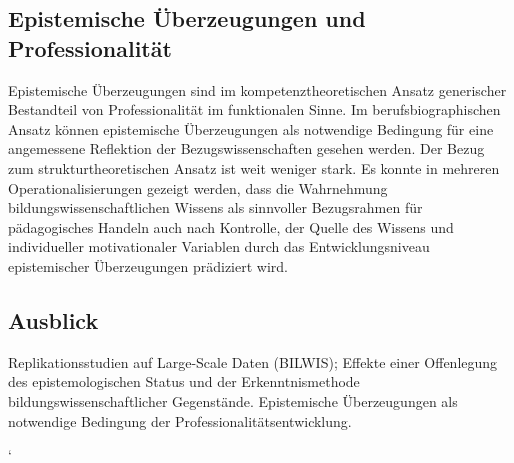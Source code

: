 \documentclass[]{tufte-handout}
\begin{document}
\subsection{Epistemische Überzeugungen und
Professionalität}\label{epistemische-uberzeugungen-und-professionalitat}

Epistemische Überzeugungen sind im kompetenztheoretischen Ansatz
generischer Bestandteil von Professionalität im funktionalen Sinne. Im
berufsbiographischen Ansatz können epistemische Überzeugungen als
notwendige Bedingung für eine angemessene Reflektion der
Bezugswissenschaften gesehen werden. Der Bezug zum strukturtheoretischen
Ansatz ist weit weniger stark. Es konnte in mehreren
Operationalisierungen gezeigt werden, dass die Wahrnehmung
bildungswissenschaftlichen Wissens als sinnvoller Bezugsrahmen für
pädagogisches Handeln auch nach Kontrolle, der Quelle des Wissens und
individueller motivationaler Variablen durch das Entwicklungsniveau
epistemischer Überzeugungen prädiziert wird.

\subsection{Ausblick}\label{ausblick}

Replikationsstudien auf Large-Scale Daten (BILWIS); Effekte einer
Offenlegung des epistemologischen Status und der Erkenntnismethode
bildungswissenschaftlicher Gegenstände. Epistemische Überzeugungen als
notwendige Bedingung der Professionalitätsentwicklung.

`


\end{document}
